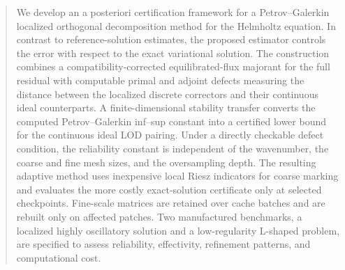 \begin{abstract}
We develop an a posteriori certification framework for a Petrov--Galerkin
localized orthogonal decomposition method for the Helmholtz equation.  In
contrast to reference-solution estimates, the proposed estimator controls
the error with respect to the exact variational solution.  The construction
combines a compatibility-corrected equilibrated-flux majorant for the full
residual with computable primal and adjoint defects measuring the distance
between the localized discrete correctors and their continuous ideal
counterparts.  A finite-dimensional stability transfer converts the
computed Petrov--Galerkin inf--sup constant into a certified lower bound for
the continuous ideal LOD pairing.  Under a directly checkable defect
condition, the reliability constant is independent of the wavenumber, the
coarse and fine mesh sizes, and the oversampling depth.  The resulting
adaptive method uses inexpensive local Riesz indicators for coarse marking
and evaluates the more costly exact-solution certificate only at selected
checkpoints.  Fine-scale matrices are retained over cache batches and are
rebuilt only on affected patches.  Two manufactured benchmarks, a localized
highly oscillatory solution and a low-regularity L-shaped problem, are
specified to assess reliability, effectivity, refinement patterns, and
computational cost.
\end{abstract}

\maketitle
